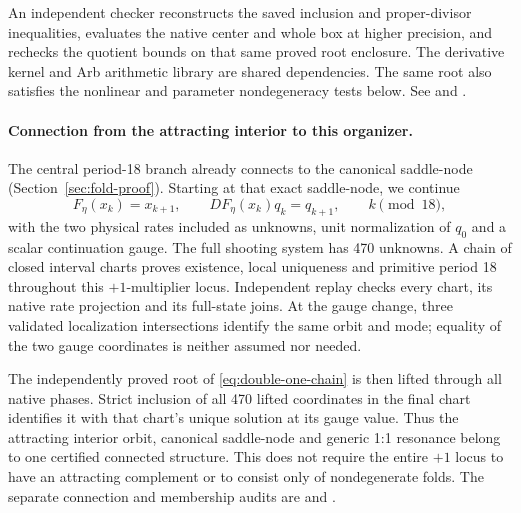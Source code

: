 \documentclass[11pt,letterpaper]{article}
\begin{document}
An independent checker reconstructs the saved inclusion and proper-divisor
inequalities, evaluates the native center and whole box at higher precision,
and rechecks the quotient bounds on that same proved root enclosure.
The derivative kernel and Arb arithmetic library are shared dependencies.
The same root also satisfies the nonlinear and parameter nondegeneracy tests below.
See  and
.

\paragraph{Connection from the attracting interior to this organizer.}
The central period-18 branch already connects to the canonical saddle-node
(Section~\ref{sec:fold-proof}). Starting at that exact saddle-node, we continue
\begin{equation}
F_\eta(x_k)=x_{k+1},\qquad DF_\eta(x_k)q_k=q_{k+1},\qquad k\pmod {18},
\end{equation}
with the two physical rates included as unknowns, unit normalization of $q_0$
and a scalar continuation gauge. The full shooting system has 470 unknowns.
A chain of \nConnectedUnitCharts{} closed interval charts proves existence,
local uniqueness and primitive period 18 throughout this $+1$-multiplier locus.
Independent replay checks every chart, its native rate projection and its
full-state joins. At the gauge change, three validated localization intersections
identify the same orbit and mode; equality of the two gauge coordinates is
neither assumed nor needed.

The independently proved root of \eqref{eq:double-one-chain} is then lifted
through all native phases. Strict inclusion of all 470 lifted coordinates in
the final chart identifies it with that chart's unique solution at its gauge
value. Thus the attracting interior orbit, canonical saddle-node and generic
1:1 resonance belong to one certified connected structure. This does not
require the entire $+1$ locus to have an attracting complement or to consist
only of nondegenerate folds. The separate connection and membership audits are
 and
.
\end{document}
